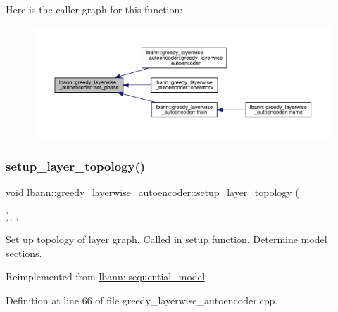 Here is the caller graph for this function\+:\nopagebreak
\begin{figure}[H]
\begin{center}
\leavevmode
\includegraphics[width=350pt]{classlbann_1_1greedy__layerwise__autoencoder_a5f237f1f6285475c5493a7d15dc32096_icgraph}
\end{center}
\end{figure}
\mbox{\label{classlbann_1_1greedy__layerwise__autoencoder_a115607e435ae4685531a81852ce01fe7}} 
\subsubsection{\texorpdfstring{setup\+\_\+layer\+\_\+topology()}{setup\_layer\_topology()}}
{\footnotesize\ttfamily void lbann\+::greedy\+\_\+layerwise\+\_\+autoencoder\+::setup\+\_\+layer\+\_\+topology (\begin{DoxyParamCaption}{ }\end{DoxyParamCaption})\hspace{0.3cm}{\ttfamily [override]}, {\ttfamily [protected]}, {\ttfamily [virtual]}}

Set up topology of layer graph. Called in setup function. Determine model sections. 

Reimplemented from \hyperlink{classlbann_1_1sequential__model_a3801a58530388fb6a8cb3e1c018e827d}{lbann\+::sequential\+\_\+model}.



Definition at line 66 of file greedy\+\_\+layerwise\+\_\+autoencoder.\+cpp.


